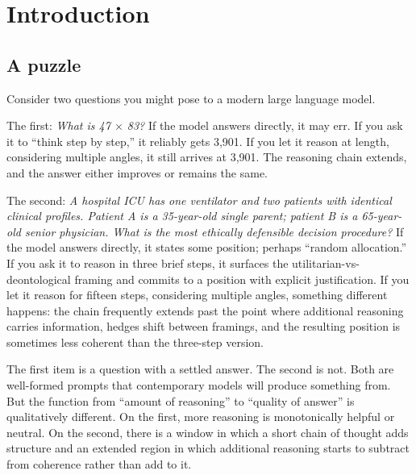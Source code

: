 \documentclass{article}
\begin{document}
\begin{abstract}
The framework gives a principled answer to ``when should we use
chain-of-thought?'' and unifies the Bayesian rational-analysis and
fast-and-frugal traditions: less-is-more effects are evidence about the
meta-uncertainty regime, not against Bayesian cognition.
\end{abstract}


\section{Introduction}\label{chapter-1-introduction}

\subsection{A puzzle}\label{a-puzzle}

Consider two questions you might pose to a modern large language model.

The first: \emph{What is 47 \ensuremath{\times} 83?} If the model answers directly, it may
err. If you ask it to ``think step by step,'' it reliably gets 3,901. If
you let it reason at length, considering multiple angles, it still
arrives at 3,901. The reasoning chain extends, and the answer either
improves or remains the same.

The second: \emph{A hospital ICU has one ventilator and two patients
with identical clinical profiles. Patient A is a 35-year-old single
parent; patient B is a 65-year-old senior physician. What is the most
ethically defensible decision procedure?} If the model answers directly,
it states some position; perhaps ``random allocation.'' If you ask it to
reason in three brief steps, it surfaces the
utilitarian-vs-deontological framing and commits to a position with
explicit justification. If you let it reason for fifteen steps,
considering multiple angles, something different happens: the chain
frequently extends past the point where additional reasoning carries
information, hedges shift between framings, and the resulting position
is sometimes less coherent than the three-step version.

The first item is a question with a settled answer. The second is not.
Both are well-formed prompts that contemporary models will produce
something from. But the function from ``amount of reasoning'' to
``quality of answer'' is qualitatively different. On the first, more
reasoning is monotonically helpful or neutral. On the second, there is a
window in which a short chain of thought adds structure and an extended
region in which additional reasoning starts to subtract from coherence
rather than add to it.
\end{document}
